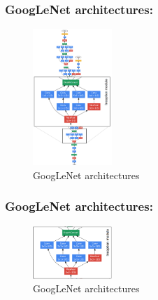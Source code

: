 \documentclass{beamer}
\begin{document}
    \begin{frame}
    \frametitle{GoogLeNet architectures: }
         \begin{figure}[H]
            \begin{center}
                \includegraphics[width=3cm]{FIGURE13-3.png}
            \end{center}
        \caption{GoogLeNet architectures}
        \end{figure}
    \end{frame}
    \begin{frame}
    \frametitle{GoogLeNet architectures: }
         \begin{figure}[H]
            \begin{center}
                \includegraphics[width=3cm]{FIGURE13-11.png}
            \end{center}
        \caption{GoogLeNet architectures}
        \end{figure}
    \end{frame}
\end{document}
